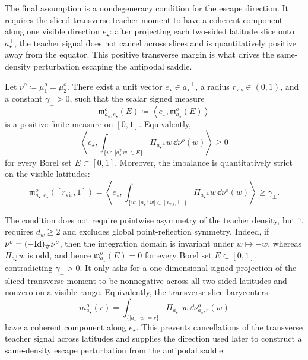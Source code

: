 The final assumption is a nondegeneracy condition for the escape direction.
It requires the sliced transverse teacher moment to have a coherent component
along one visible direction \(e_\star\): after projecting each two-sided latitude
slice onto \(a_\star^\perp\), the teacher signal does not cancel across slices
and is quantitatively positive away from the equator.  This positive transverse
margin is what drives the same-density perturbation escaping the antipodal
saddle.
\begin{assumption}
\label{assumption:quantitative-unweighted-two-sided-transverse-imbalance}
Let $\nu^o \coloneq \mu_1^o = \mu_2^o$.
There exist a unit vector \(e_\star\in {a_\star}^\perp\), a radius
\(r_{\mathrm{vis}}\in(0,1)\), and a constant \(\gamma_\perp>0\), such that
the scalar signed measure
\[
    \mathfrak m_{a_\star,e_\star}^o(E)
    \coloneq
    \left\langle e_\star,\mathfrak m_{a_\star}^o(E)\right\rangle
\]
is a positive finite measure on \([0,1]\).  Equivalently,
\[
    \left\langle
        e_\star,
        \int_{\{w:\ |a_\star^\top w|\in E\}}
        \Pi_{{a_\star}^\perp}w\,\dd\nu^o(w)
    \right\rangle
    \ge0
\]
for every Borel set \(E\subset[0,1]\).  Moreover, the imbalance is
quantitatively strict on the visible latitudes:
\[
    \mathfrak m_{{a_\star},e_\star}^o([r_{\mathrm{vis}},1])
    =
    \left\langle
        e_\star,
        \int_{\{w:\ |{a_\star}^\top w|\in [r_{\mathrm{vis}},1]\}}
        \Pi_{{a_\star}^\perp}w\,\dd\nu^o(w)
    \right\rangle
    \ge \gamma_\perp.
\]
\end{assumption}

\begin{remark}
The condition does not require pointwise asymmetry of the teacher density,
but it requires \(d_w\ge2\) and excludes global point-reflection symmetry.
Indeed, if \(\nu^o=(-\mathrm{Id})_\#\nu^o\), then the integration domain is invariant
under \(w\mapsto-w\), whereas \(\Pi_{a_\star^\perp}w\) is odd, and hence
\(\mathfrak m_{a_\star}^o(E)=0\) for every Borel set \(E\subset[0,1]\),
contradicting \(\gamma_\perp>0\).
It only asks for a one-dimensional signed projection of the sliced transverse
moment to be nonnegative across all two-sided latitudes and nonzero on a visible
range.  Equivalently, the transverse slice barycenters
\[
    m_{a_\star}^o(r)
    =
    \int_{\{|{a_\star}^\top w|=r\}}
    \Pi_{{a_\star}^\perp}w\,\dd\nu_{{a_\star},r}^o(w)
\]
have a coherent component along \(e_\star\).  This prevents cancellations of
the transverse teacher signal across latitudes and supplies the direction used
later to construct a same-density escape perturbation from the antipodal saddle.
\end{remark}

